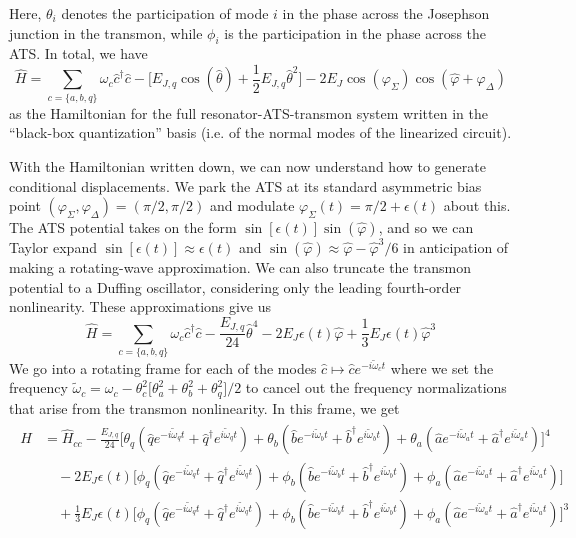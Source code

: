 Here, $\theta_i$ denotes the participation of mode $i$ in the phase across the Josephson junction in the transmon, while $\phi_i$ is the participation in the phase across the ATS. In total, we have
\begin{equation}
\hat{H} = \sum_{c = \{a, b, q\}}\omega_c \hat{c}^\dagger\hat{c} - \Big[E_{J,q}\cos(\hat{\theta}) + \frac{1}{2}E_{J,q} \hat{\theta}^2\Big] - 2E_J \cos(\varphi_\Sigma)\cos(\hat{\varphi} + \varphi_\Delta)
\end{equation}
as the Hamiltonian for the full resonator-ATS-transmon system written in the ``black-box quantization'' basis (i.e. of the normal modes of the linearized circuit). 

With the Hamiltonian written down, we can now understand how to generate conditional displacements. We park the ATS at its standard asymmetric bias point $(\varphi_\Sigma, \varphi_\Delta) = (\pi/2, \pi/2)$ and modulate $\varphi_\Sigma(t) = \pi/2 + \epsilon(t)$ about this. The ATS potential takes on the form $\sin[\epsilon(t)]\sin(\hat{\varphi})$, and so we can Taylor expand $\sin[\epsilon(t)] \approx \epsilon(t)$ and $\sin(\hat{\varphi}) \approx \hat{\varphi} - \hat{\varphi}^3/6$ in anticipation of making a rotating-wave approximation. We can also truncate the transmon potential to a Duffing oscillator, considering only the leading fourth-order nonlinearity. These approximations give us
\begin{equation}
\hat{H} = \sum_{c = \{a, b, q\}}\omega_c \hat{c}^\dagger\hat{c} - \frac{E_{J,q}}{24}\hat{\theta}^4 - 2E_J \epsilon(t)\hat{\varphi} + \frac{1}{3}E_J\epsilon(t)\hat{\varphi}^3
\end{equation}
We go into a rotating frame for each of the modes $\hat{c} \mapsto \hat{c} e^{-i\tilde{\omega}_c t}$ where we set the frequency $\widetilde{\omega}_c = \omega_c - \theta_{c}^{2} \big[\theta_{a}^{2} + \theta_{b}^{2} + \theta_{q}^{2}\big]/2$ to cancel out the frequency normalizations that arise from the transmon nonlinearity. In this frame, we get
\begin{align}
\begin{split}
\hat{H} &= \hat{H}_{cc} - \frac{E_{J,q}}{24}\Big[\theta_q(\hat{q}e^{-i\tilde{\omega}_q t} + \hat{q}^\dagger e^{i\tilde{\omega}_q t}) + \theta_b(\hat{b}e^{-i\tilde{\omega}_b t} + \hat{b}^\dagger e^{i\tilde{\omega}_b t}) + \theta_a(\hat{a}e^{-i\tilde{\omega}_a t} + \hat{a}^\dagger e^{i\tilde{\omega}_a t})\Big]^4 \\&\quad- 2E_J\epsilon(t)\Big[\phi_q(\hat{q}e^{-i\tilde{\omega}_q t} + \hat{q}^\dagger e^{i\tilde{\omega}_q t}) + \phi_b(\hat{b}e^{-i\tilde{\omega}_b t} + \hat{b}^\dagger e^{i\tilde{\omega}_b t}) + \phi_a(\hat{a}e^{-i\tilde{\omega}_a t} + \hat{a}^\dagger e^{i\tilde{\omega}_a t})\Big]\\ &\quad + \frac{1}{3}E_J\epsilon(t)\Big[\phi_q(\hat{q}e^{-i\tilde{\omega}_q t} + \hat{q}^\dagger e^{i\tilde{\omega}_q t}) + \phi_b(\hat{b}e^{-i\tilde{\omega}_b t} + \hat{b}^\dagger e^{i\tilde{\omega}_b t}) + \phi_a(\hat{a}e^{-i\tilde{\omega}_a t} + \hat{a}^\dagger e^{i\tilde{\omega}_a t})\Big]^3
\end{split}
\end{align}
